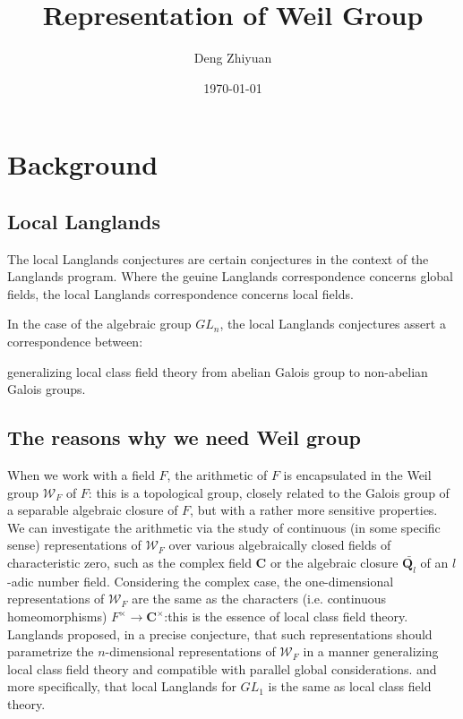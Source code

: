 \documentclass{article}
\title{Representation of Weil Group}
\date{\today }
\author{Deng Zhiyuan}
\theoremstyle{theorem}
\begin{document}
\maketitle
\section{Background}
\subsection{Local Langlands}
The local Langlands conjectures are certain conjectures in the context of the Langlands program. Where the geuine Langlands correspondence concerns global fields, the local Langlands correspondence concerns local fields.

In the case of the algebraic group $GL_{n}$, the local Langlands conjectures assert a correspondence between:



generalizing local class field theory from abelian Galois group to non-abelian Galois groups.
\subsection{The reasons why we need Weil group}
When we work with a field $F$, the arithmetic of $F$ is encapsulated in the Weil group $\mathcal{W}_{F}$ of $F$: this is a topological group, closely related to the Galois group of a separable algebraic closure of $F$, but with a rather more sensitive properties. We can investigate the arithmetic via the study of continuous (in some specific sense) representations of $\mathcal{W}_{F}$ over various algebraically closed fields of characteristic zero, such as the complex field $\mathbf{C}$ or the algebraic closure $\bar{\mathbf{Q}_{l}}$ of an $l$-adic number field. Considering the complex case, the one-dimensional representations of $\mathcal{W}_{F}$ are the same as the characters (i.e. continuous homeomorphisms) $F^{\times}\rightarrow \mathbf{C}^{\times}$:this is the essence of local class field theory. Langlands proposed, in a precise conjecture, that such representations should parametrize the $n$-dimensional representations of $\mathcal{W}_{F}$ in a manner generalizing local class field theory and compatible with parallel global considerations. and more specifically, that local Langlands for $GL_1$ is the same as local class field theory.
\end{document}
